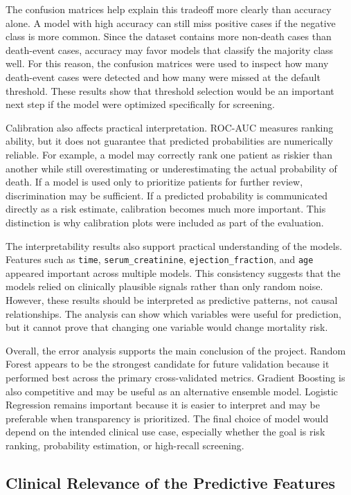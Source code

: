 \documentclass{article}
\begin{document}
The confusion matrices help explain this tradeoff more clearly than accuracy alone. A model with high accuracy can still miss positive cases if the negative class is more common. Since the dataset contains more non-death cases than death-event cases, accuracy may favor models that classify the majority class well. For this reason, the confusion matrices were used to inspect how many death-event cases were detected and how many were missed at the default threshold. These results show that threshold selection would be an important next step if the model were optimized specifically for screening.

Calibration also affects practical interpretation. ROC-AUC measures ranking ability, but it does not guarantee that predicted probabilities are numerically reliable. For example, a model may correctly rank one patient as riskier than another while still overestimating or underestimating the actual probability of death. If a model is used only to prioritize patients for further review, discrimination may be sufficient. If a predicted probability is communicated directly as a risk estimate, calibration becomes much more important. This distinction is why calibration plots were included as part of the evaluation.

The interpretability results also support practical understanding of the models. Features such as \texttt{time}, \texttt{serum\_creatinine}, \texttt{ejection\_fraction}, and \texttt{age} appeared important across multiple models. This consistency suggests that the models relied on clinically plausible signals rather than only random noise. However, these results should be interpreted as predictive patterns, not causal relationships. The analysis can show which variables were useful for prediction, but it cannot prove that changing one variable would change mortality risk.

Overall, the error analysis supports the main conclusion of the project. Random Forest appears to be the strongest candidate for future validation because it performed best across the primary cross-validated metrics. Gradient Boosting is also competitive and may be useful as an alternative ensemble model. Logistic Regression remains important because it is easier to interpret and may be preferable when transparency is prioritized. The final choice of model would depend on the intended clinical use case, especially whether the goal is risk ranking, probability estimation, or high-recall screening.

\subsection{Clinical Relevance of the Predictive Features}
\end{document}
